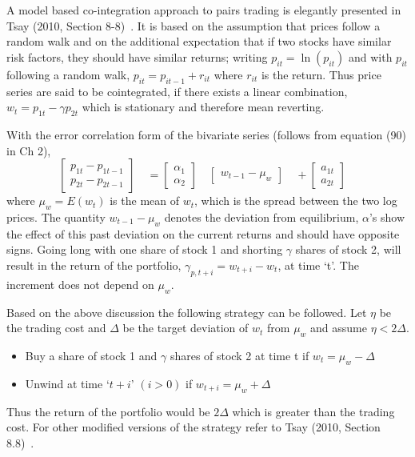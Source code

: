 A model based co-integration approach to pairs trading is elegantly presented in Tsay (2010, Section 8-8)~\cite{tsay}. It is based on the assumption that prices follow a random walk and on the additional expectation that if two stocks have similar risk factors, they should have similar returns; writing $p_{it} = \ln{(p_{it})}$ and with $p_{it}$ following a random walk, $p_{it} = p_{it-1} + r_{it}$ where $r_{it}$ is the return. Thus price series are said to be cointegrated, if there exists a linear combination, $w_t = p_{1t} - \gamma p_{2t}$ which is stationary and therefore mean reverting.


With the error correlation form of the bivariate series (follows from equation (90) in Ch 2),
	\begin{equation}
	\begin{bmatrix}
	p_{1t} - p_{1t-1} \\
	p_{2t} - p_{2t-1}
	\end{bmatrix}\quad
	= \begin{bmatrix} 
	\alpha_1\\ \alpha_2 
	\end{bmatrix}\quad 
	\begin{bmatrix} 
	w_{t-1} - \mu_{w}
	\end{bmatrix}\quad + 
	\begin{bmatrix} 
	a_{1t} \\ a_{2t} 
	\end{bmatrix}\quad
	\end{equation}
where $\mu_w = E(w_t)$ is the mean of $w_t$, which is the spread between the two log prices. The quantity $w_{t-1} - \mu_w$ denotes the deviation from equilibrium, $\alpha$'s show the effect of this past deviation on the current returns and should have opposite signs. Going long with one share of stock 1 and shorting $\gamma$ shares of stock 2, will result in the return of the portfolio, $\gamma_{p,t+i} = w_{t+i} - w_t$, at time `t'. The increment does not depend on $\mu_w$.


Based on the above discussion the following strategy can be followed. Let $\eta$ be the trading cost and $\Delta$ be the target deviation of $w_t$ from $\mu_w$ and assume $\eta < 2\Delta$.
\begin{itemize}
\item Buy a share of stock 1 and $\gamma$ shares of stock 2 at time t if $w_t = \mu_w - \Delta$

\item Unwind at time `$t+i$' $(i>0)$ if $w_{t+i} = \mu_w + \Delta$
\end{itemize}
Thus the return of the portfolio would be $2\Delta$ which is greater than the trading cost. For other modified versions of the strategy refer to Tsay (2010, Section 8.8)~\cite{tsay}.

